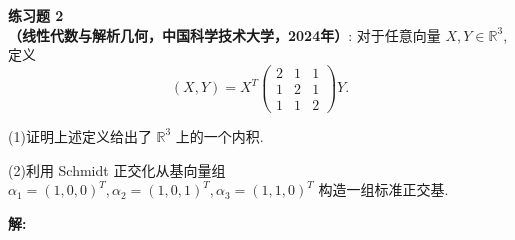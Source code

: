\documentclass[a4paper, 11pt]{article}
\newenvironment{problem}[2][练习题]
    { \begin{mdframed}[backgroundcolor=gray!5] \textbf{#1 #2} \\}
    {  \end{mdframed}}
\newenvironment{solution}
    {\textbf{解:}}
    {}
\begin{document}

\begin{problem}{2}
\textbf{（线性代数与解析几何，中国科学技术大学，2024年）}: 对于任意向量 $X, Y \in \mathbb{R}^3$, 定义
$$
(X, Y)=X^T\left(\begin{array}{ccc}
2 & 1 & 1 \\
1 & 2 & 1 \\
1 & 1 & 2
\end{array}\right) Y .
$$

(1)证明上述定义给出了 $\mathbb{R}^3$ 上的一个内积.

(2)利用 Schmidt 正交化从基向量组 $\alpha_1=(1,0,0)^T, \alpha_2=(1,0,1)^T, \alpha_3=(1,1,0)^T$ 构造一组标准正交基.
\end{problem}

\begin{solution}


\end{solution} 





\end{document}
